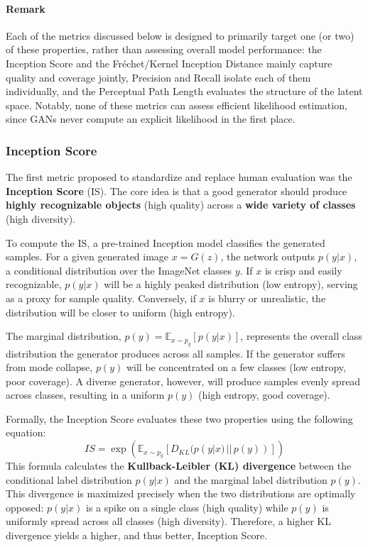 \paragraph{Remark} Each of the metrics discussed below is designed to primarily target one (or two) of these properties, rather than assessing overall model performance: the Inception Score and the Fréchet/Kernel Inception Distance mainly capture quality and coverage jointly, Precision and Recall isolate each of them individually, and the Perceptual Path Length evaluates the structure of the latent space.
Notably, none of these metrics can assess efficient likelihood estimation, since GANs never compute an explicit likelihood in the first place.

\subsubsection{Inception Score}
The first metric proposed to standardize and replace human evaluation was the \textbf{Inception Score} (IS). 
The core idea is that a good generator should produce \textbf{highly recognizable objects} (high quality) across a \textbf{wide variety of classes} (high diversity).

To compute the IS, a pre-trained Inception model classifies the generated samples. 
For a given generated image $x = G(z)$, the network outputs $p(y|x)$, a conditional distribution over the ImageNet classes $y$. 
If $x$ is crisp and easily recognizable, $p(y|x)$ will be a highly peaked distribution (low entropy), serving as a proxy for sample quality. 
Conversely, if $x$ is blurry or unrealistic, the distribution will be closer to uniform (high entropy).

The marginal distribution, $p(y) = \mathbb{E}_{x \sim p_g}[p(y|x)]$, represents the overall class distribution the generator produces across all samples. 
If the generator suffers from mode collapse, $p(y)$ will be concentrated on a few classes (low entropy, poor coverage). 
A diverse generator, however, will produce samples evenly spread across classes, resulting in a uniform $p(y)$ (high entropy, good coverage).

Formally, the Inception Score evaluates these two properties using the following equation:
\begin{equation}
    IS = \exp \left( \mathbb{E}_{x \sim p_{g}} \left[ D_{KL}(p(y|x) \,||\, p(y)) \right] \right)
\end{equation}
This formula calculates the \textbf{Kullback-Leibler (KL) divergence} between the conditional label distribution $p(y|x)$ and the marginal label distribution $p(y)$. This divergence is maximized precisely when the two distributions are optimally opposed: $p(y|x)$ is a spike on a single class (high quality) while $p(y)$ is uniformly spread across all classes (high diversity). Therefore, a higher KL divergence yields a higher, and thus better, Inception Score.

